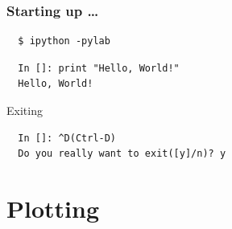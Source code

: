 \documentclass[14pt,compress]{beamer}
\begin{document}
\begin{frame}[fragile]
\frametitle{Starting up \ldots}
\begin{block}{}
\begin{verbatim}
  $ ipython -pylab  
\end{verbatim}
\end{block}
\begin{lstlisting}     
  In []: print "Hello, World!"
  Hello, World!
\end{lstlisting}
Exiting
\begin{lstlisting}     
  In []: ^D(Ctrl-D)
  Do you really want to exit([y]/n)? y
\end{lstlisting}
\end{frame}



\section{Plotting}
\end{document}
